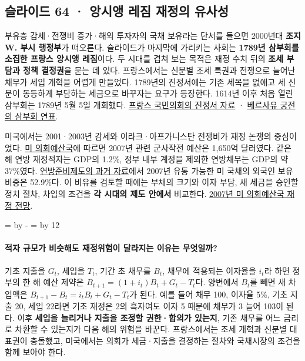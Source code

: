\documentclass[10pt,a4paper]{article}
\newcommand{\ReserveQuestionSpace}{%
  \par\begingroup
  \dimen0=\pagegoal \advance\dimen0 by -\pagetotal
  \dimen2=\baselineskip \multiply\dimen2 by 12
  \ifdim\dimen0<\dimen2 \newpage\fi
  \endgroup}
\begin{document}
\subsection{슬라이드 64 · 앙시앵 레짐 재정의 유사성}
부유층 감세·전쟁비 증가·해외 투자자의 국채 보유라는 단서를 들으면 2000년대 \textbf{조지 W. 부시 행정부}가 떠오른다. 슬라이드가 마지막에 가리키는 사회는 \textbf{1789년 삼부회를 소집한 프랑스 앙시앵 레짐}이다. 두 시대를 겹쳐 보는 목적은 재정 수치 뒤의 \textbf{조세 부담과 정책 결정권}을 묻는 데 있다. 프랑스에서는 신분별 조세 특권과 전쟁으로 늘어난 채무가 세입 개혁을 어렵게 만들었다. 1789년의 진정서에는 기존 세목을 없애고 세 신분이 동등하게 부담하는 세금으로 바꾸자는 요구가 등장한다. 1614년 이후 처음 열린 삼부회는 1789년 5월 5일 개회했다. \href{https://www.assemblee-nationale.fr/dyn/histoire-et-patrimoine/revolution-francaise/reunion-des-etats-generaux-les-cahiers-de-doleances}{프랑스 국민의회의 진정서 자료} · \href{https://en.chateauversailles.fr/discover/history/key-dates/summoning-estates-general-1789}{베르사유 궁전의 삼부회 연표}.\par

미국에서는 2001·2003년 감세와 이라크·아프가니스탄 전쟁비가 재정 논쟁의 중심이었다. \href{https://www.cbo.gov/publication/24751}{미 의회예산국}에 따르면 2007년 관련 군사작전 예산은 1,650억 달러였다. 같은 해 연방 재정적자는 GDP의 1.2\%, 정부 내부 계정을 제외한 연방채무는 GDP의 약 37\%였다. \href{https://www.federalreserve.gov/econres/notes/feds-notes/the-international-role-of-the-u-s-dollar-2025-edition-accessible-20250718.htm}{연방준비제도의 과거 자료}에서 2007년 유통 가능한 미 국채의 외국인 보유 비중은 52.9\%다. 이 비유를 검토할 때에는 부채의 크기와 이자 부담, 새 세금을 승인할 정치 절차, 차입의 조건을 \textbf{각 시대의 제도 안에서} 비교한다. \href{https://www.cbo.gov/sites/default/files/cbofiles/ftpdocs/88xx/doc8877/chapter1.4.1.shtml}{2007년 미 의회예산국 재정 전망}.\par

\ReserveQuestionSpace
\paragraph{적자 규모가 비슷해도 재정위험이 달라지는 이유는 무엇일까?}

기초 지출을 $G_t$, 세입을 $T_t$, 기간 초 채무를 $B_t$, 채무에 적용되는 이자율을 $i_t$라 하면 정부의 한 해 예산 제약은 $B_{t+1}=(1+i_t)B_t+G_t-T_t$다. 양변에서 $B_t$를 빼면 새 차입액은 $B_{t+1}-B_t=i_tB_t+G_t-T_t$가 된다. 예를 들어 채무 100, 이자율 5\%, 기초 지출 20, 세입 22라면 기초 재정은 2의 흑자여도 이자 5 때문에 채무가 3 늘어 103이 된다. 이후 \textbf{세입을 늘리거나 지출을 조정할 권한·합의가 있는지}, 기존 채무를 어느 금리로 차환할 수 있는지가 다음 해의 위험을 바꾼다. 프랑스에서는 조세 개혁과 신분별 대표권이 충돌했고, 미국에서는 의회가 세금·지출을 결정하는 절차와 국채시장의 조건을 함께 보아야 한다.\par
\end{document}
